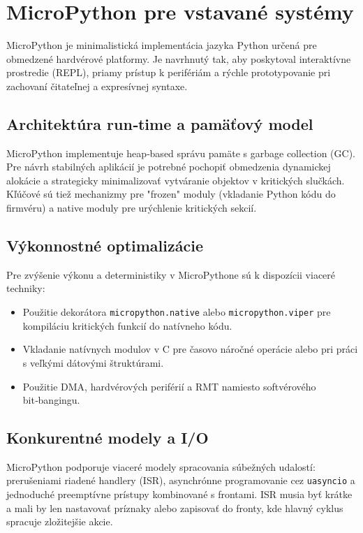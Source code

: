 \section{MicroPython pre vstavané systémy}
\label{sec:micropython}

MicroPython je minimalistická implementácia jazyka Python určená pre obmedzené hardvérové platformy. Je navrhnutý tak, aby poskytoval interaktívne prostredie (REPL), priamy prístup k perifériám a rýchle prototypovanie pri zachovaní čitateľnej a expresívnej syntaxe.

\subsection*{Architektúra run‑time a pamäťový model}
MicroPython implementuje heap‑based správu pamäte s garbage collection (GC). Pre návrh stabilných aplikácií je potrebné pochopiť obmedzenia dynamickej alokácie a strategicky minimalizovať vytváranie objektov v kritických slučkách. Kľúčové sú tiež mechanizmy pre "frozen" moduly (vkladanie Python kódu do firmvéru) a native moduly pre urýchlenie kritických sekcií.

\subsection*{Výkonnostné optimalizácie}
Pre zvýšenie výkonu a deterministiky v MicroPythone sú k dispozícii viaceré techniky:
\begin{itemize}
	\item Použitie dekorátora \texttt{micropython.native} alebo \texttt{micropython.viper} pre kompiláciu kritických funkcií do natívneho kódu.
	\item Vkladanie natívnych modulov v C pre časovo náročné operácie alebo pri práci s veľkými dátovými štruktúrami.
	\item Použitie DMA, hardvérových periférií a RMT namiesto softvérového bit‑bangingu.
\end{itemize}

\subsection*{Konkurentné modely a I/O}
MicroPython podporuje viaceré modely spracovania súbežných udalostí: prerušeniami riadené handlery (ISR), asynchrónne programovanie cez \texttt{uasyncio} a jednoduché preemptívne prístupy kombinované s frontami. ISR musia byť krátke a mali by len nastavovať príznaky alebo zapisovať do fronty, kde hlavný cyklus spracuje zložitejšie akcie.

